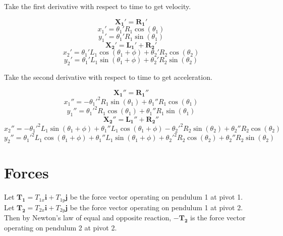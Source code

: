 \documentclass[draft]{article}
\begin{document}
Take the first derivative with respect to time to get velocity.

\[
\mathbf{X_1'} = \mathbf{R_1'}
\]
\[
x_1' = \theta_1' R_1 \cos(\theta_1)
\]
\[
y_1' = \theta_1' R_1 \sin(\theta_1)
\]
\[
\mathbf{X_2'} = \mathbf{L_1'} + \mathbf{R_2'}
\]
\[
x_2' = \theta_1' L_1 \cos(\theta_1+\phi) + \theta_2' R_2 \cos(\theta_2)
\]
\[
y_2' = \theta_1' L_1 \sin(\theta_1+\phi) + \theta_2' R_2 \sin(\theta_2)
\]

Take the second derivative with respect to time to get acceleration.

\[
\mathbf{X_1''} = \mathbf{R_1''}
\]
\begin{equation}\label{E01}
x_1'' = -\theta_1'^2 R_1 \sin(\theta_1) + \theta_1'' R_1 \cos(\theta_1)
\end{equation}
\begin{equation}\label{E02}
y_1'' = \theta_1'^2 R_1 \cos(\theta_1) + \theta_1'' R_1 \sin(\theta_1)
\end{equation}
\[
\mathbf{X_2''} = \mathbf{L_1''} + \mathbf{R_2''}
\]
\begin{equation}\label{E1}
x_2'' = -\theta_1'^2 L_1 \sin(\theta_1+\phi) + \theta_1'' L_1 \cos(\theta_1+\phi)
- \theta_2'^2 R_2 \sin(\theta_2) + \theta_2'' R_2 \cos(\theta_2)
\end{equation}
\begin{equation}\label{E2}
y_2'' = \theta_1'^2 L_1 \cos(\theta_1+\phi) + \theta_1'' L_1 \sin(\theta_1+\phi)
+ \theta_2'^2 R_2 \cos(\theta_2) + \theta_2'' R_2 \sin(\theta_2)
\end{equation}


\section{Forces}

Let $\mathbf{T_1} = T_{1x} \mathbf{i} + T_{1y} \mathbf{j}$ be the force vector operating on pendulum 1 at pivot 1.\\
Let $\mathbf{T_2} = T_{2x} \mathbf{i} + T_{2y} \mathbf{j}$ be the force vector operating on pendulum 1 at pivot 2.
Then by Newton's law of equal and opposite reaction, $-\mathbf{T_2}$ is the force vector operating on pendulum 2 at pivot 2.
\end{document}
